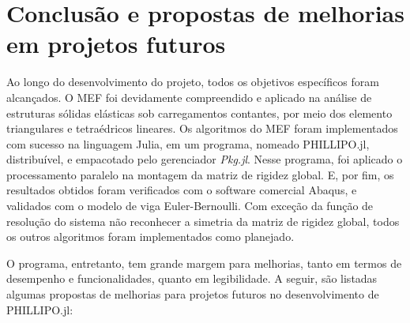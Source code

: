 \chapter{Conclusão e propostas de melhorias em projetos futuros}

Ao longo do desenvolvimento do projeto, todos os objetivos específicos foram alcançados. O MEF foi devidamente compreendido e aplicado na análise de estruturas sólidas elásticas sob carregamentos contantes, por meio dos elemento triangulares e tetraédricos lineares. Os algoritmos do MEF foram implementados com sucesso na linguagem Julia, em um programa, nomeado PHILLIPO.jl, distribuível, e empacotado pelo gerenciador \emph{Pkg.jl}. Nesse programa, foi aplicado o processamento paralelo na montagem da matriz de rigidez global. E, por fim, os resultados obtidos foram verificados com o software comercial Abaqus, e validados com o modelo de viga Euler-Bernoulli. Com exceção da função de resolução do sistema não reconhecer a simetria da matriz de rigidez global, todos os outros algoritmos foram implementados como planejado.

O programa, entretanto, tem grande margem para melhorias, tanto em termos de desempenho e funcionalidades, quanto em legibilidade. A seguir, são listadas algumas propostas de melhorias para projetos futuros no desenvolvimento de PHILLIPO.jl:

